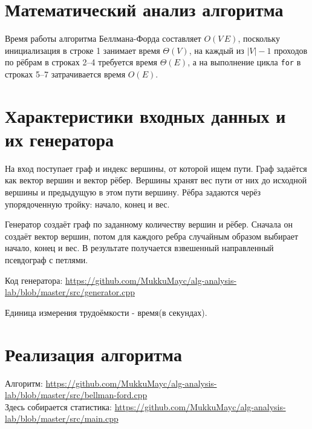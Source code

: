 \documentclass[a4paper,12pt]{article}
\begin{document}
\section{Математический анализ алгоритма}
  Время работы алгоритма Беллмана-Форда составляет $O(V\,E)$, поскольку
  инициализация в строке 1 занимает время $\Theta(V)$, на каждый из $|V| - 1$ 
  проходов по рёбрам в строках 2--4 требуется время $\Theta(E)$, а на выполнение цикла
  \texttt{for} в строках 5--7 затрачивается время $O(E)$.\cite[с.~689-690]{cormen}

\section{Характеристики входных данных и их генератора}
На вход поступает граф и индекс вершины, от которой ищем пути.
Граф задаётся как вектор вершин и вектор рёбер.
Вершины хранят вес пути от них до исходной вершины и предыдущую в этом пути вершину.
Рёбра задаются черёз упорядоченную тройку: начало, конец и вес.

Генератор создаёт граф по заданному количеству вершин и рёбер.
Сначала он создаёт вектор вершин, потом для каждого ребра случайным образом 
выбирает начало, конец и вес.
В результате получается взвешенный направленный псевдограф с петлями.

Код генератора: \url{https://github.com/MukkuMayc/alg-analysis-lab/blob/master/src/generator.cpp}

Единица измерения трудоёмкости - время(в секундах).
\section{Реализация алгоритма}
Алгоритм:
\url{https://github.com/MukkuMayc/alg-analysis-lab/blob/master/src/bellman-ford.cpp} \\
Здесь собирается статистика:
\url{https://github.com/MukkuMayc/alg-analysis-lab/blob/master/src/main.cpp}
\newpage
\end{document}
